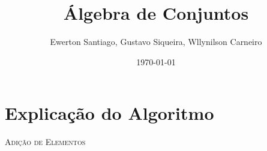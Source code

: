 \documentclass[a4paper]{article}
\begin{document}
  \title{Álgebra de Conjuntos}
  \author{Ewerton Santiago, Gustavo Siqueira, Wllynilson Carneiro}
  \date{\today}
  \maketitle
  
  \section{Explicação do Algoritmo}

  \begin{algorithm}[H]
    \label{alg1}
    \caption {\textsc{Adição de Elementos}}
    \Saida{}
    \SetAlgoLined
    \end{algorithm}
  
\end{document}
